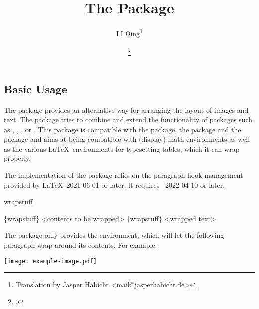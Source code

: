 \documentclass{ctxdoc}
\begin{document}

  \title{\bfseries The  Package}
  \author{LI Qing\thanks{Translation by Jasper Habicht <mail@jasperhabicht.de>}}
  \date{\filedate\qquad\fileversion\thanks{\gitsha{\ExplFileVersion}.}}
  \maketitle

  \begin{documentation}

  \section{Basic Usage}

  The  package provides an alternative way for arranging the layout of images and text.
  The  package tries to combine and extend the functionality of packages such as , , ,
   or .
  This package is compatible with the  package, the  package and the  package and aims at being compatible with (display) math environments as well as the various \LaTeX\ environments for typesetting tables, which it can wrap properly.

  The implementation of the  package relies on the paragraph hook management provided by \LaTeX\ 2021-06-01 or later. It requires \LaTeXiii\ 2022-04-10 or later.

  \begin{function}{wrapstuff}
    \begin{syntax}
      \{wrapstuff\}
        <contents to be wrapped>
      \{wrapstuff\}
      <wrapped text>
    \end{syntax}
    The  package only provides the  environment, which will let the following paragraph wrap around its contents. For example:
    \begin{Example}[frame=single,numbers=none,gobble=5]
      \begin{wrapstuff}[c,top=1]
        \texttt{[image: example-image.pdf]}
      \end{wrapstuff}
      \zhlipsum[1][name=zhufu]
    \end{Example}
  \end{function}


\end{documentation}
\end{document}
